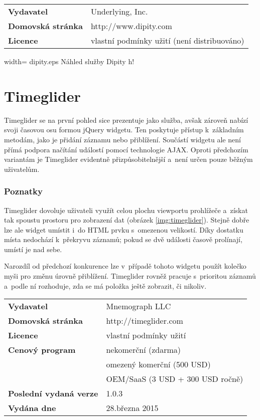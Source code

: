 		
		\vspace{\baselineskip}
		\renewcommand{\arraystretch}{1.3}
		\noindent
		\begin{tabularx}{\textwidth}{|lX|}
		\hline
		\bf Vydavatel & Underlying, Inc.\\
		\bf Domovská stránka & http://www.dipity.com \\
		\bf Licence & vlastní podmínky užití (není distribuováno) \\
		\hline
		\end{tabularx}
		
		  {width=\textwidth}
		  {dipity.eps}
		  {Náhled služby {\sf Dipity}}
		  {h!}
		
	\section{\sf Timeglider}
	\label{analyza-timeglider}
		{\sf Timeglider} se na první pohled sice prezentuje jako služba, avšak zároveň nabízí svoji časovou osu formou jQuery widgetu. Ten poskytuje přístup k~základním metodám, jako je přidání záznamu nebo přiblížení. Součástí widgetu ale není přímá podpora načítání událostí pomocí technologie AJAX. Oproti předchozím variantám je {\sf Timeglider} evidentně přizpůsobitelnější a~není určen pouze běžným uživatelům.
		
		\subsubsection*{Poznatky} 
		{\sf Timeglider} dovoluje uživateli využít celou plochu viewportu prohlížeče a~získat tak spoustu prostoru pro zobrazení dat (obrázek \ref{img:timeglider}). Stejně dobře lze ale widget umístit i~do HTML prvku s~omezenou velikostí. Díky dostatku místa nedochází k~překryvu záznamů; pokud se dvě události časově prolínají, umístí je nad sebe.
		
		Narozdíl od předchozí konkurence lze v~případě tohoto widgetu použít kolečko myši pro změnu úrovně přiblížení. {\sf Timeglider} rovněž pracuje s~prioritou záznamů a~podle ní rozhoduje, zda se má položka ještě zobrazit, či nikoliv.
		
		\vspace{\baselineskip}
		\renewcommand{\arraystretch}{1.3}
		\noindent
		\begin{tabularx}{\textwidth}{|lX|}
		\hline
		\bf Vydavatel & Mnemograph LLC\\
		\bf Domovská stránka & http://timeglider.com \\
		\bf Licence & vlastní podmínky užití \\
		\bf Cenový program & nekomerční (zdarma) \\
		 & omezený komerční (500 USD) \\
		 & OEM/SaaS (3\ts000 USD + 300 USD ročně) \\
		\bf Poslední vydaná verze & 1.0.3 \\
		\bf Vydána dne & 28.\ts března 2015 \\
		\hline
		\end{tabularx}
		
